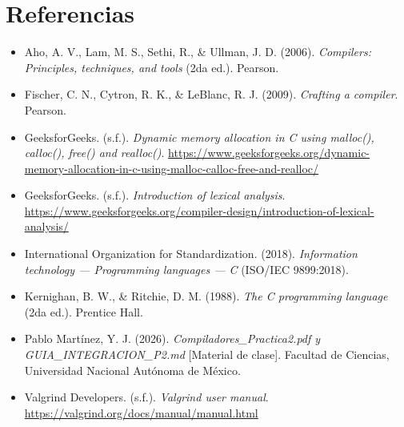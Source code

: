 \documentclass[12pt, letterpaper]{article}
\begin{document}
\section{Referencias}
\begin{itemize}
    \item Aho, A. V., Lam, M. S., Sethi, R., \& Ullman, J. D. (2006). \textit{Compilers: Principles, techniques, and tools} (2da ed.). Pearson.
    
    \item Fischer, C. N., Cytron, R. K., \& LeBlanc, R. J. (2009). \textit{Crafting a compiler}. Pearson.
    
    \item GeeksforGeeks. (s.f.). \textit{Dynamic memory allocation in C using malloc(), calloc(), free() and realloc()}. \url{https://www.geeksforgeeks.org/dynamic-memory-allocation-in-c-using-malloc-calloc-free-and-realloc/}
    
    \item GeeksforGeeks. (s.f.). \textit{Introduction of lexical analysis}. \url{https://www.geeksforgeeks.org/compiler-design/introduction-of-lexical-analysis/}
    
    \item International Organization for Standardization. (2018). \textit{Information technology — Programming languages — C} (ISO/IEC 9899:2018).
    
    \item Kernighan, B. W., \& Ritchie, D. M. (1988). \textit{The C programming language} (2da ed.). Prentice Hall.
    
    \item Pablo Martínez, Y. J. (2026). \textit{Compiladores\_Practica2.pdf y GUIA\_INTEGRACION\_P2.md} [Material de clase]. Facultad de Ciencias, Universidad Nacional Autónoma de México.
    
    \item Valgrind Developers. (s.f.). \textit{Valgrind user manual}. \url{https://valgrind.org/docs/manual/manual.html}
\end{itemize}
\end{document}
